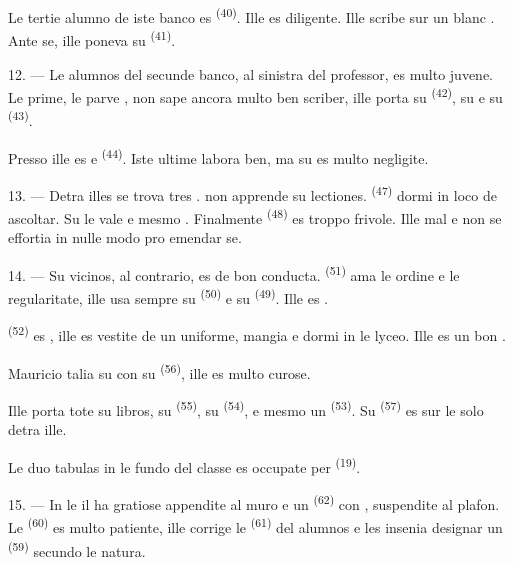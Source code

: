 Le tertie alumno de iste banco es  \textsuperscript{(40)}. Ille
es diligente. Ille scribe sur un blanc . Ante se, ille
poneva su  \textsuperscript{(41)}.

12. --- Le alumnos del secunde banco, al sinistra del professor, es multo juvene.
Le prime, le parve , non sape ancora multo ben scriber, ille
porta su  \textsuperscript{(42)}, su  e
su  \textsuperscript{(43)}.

Presso ille es  e  \textsuperscript{(44)}. Iste
ultime labora ben, ma su  es multo negligite.

13. --- Detra illes se trova tres .  non
apprende su lectiones.  \textsuperscript{(47)} dormi in loco de
ascoltar. Su  le vale  e mesmo
. Finalmente  \textsuperscript{(48)} es
troppo frivole. Ille  mal e non se effortia in nulle modo
pro emendar se.

14. --- Su vicinos, al contrario, es de bon conducta. 
\textsuperscript{(51)} ama le ordine e le regularitate, ille usa sempre su
 \textsuperscript{(50)} e su 
\textsuperscript{(49)}. Ille es .

 \textsuperscript{(52)} es , ille es vestite
de un uniforme, mangia e dormi in le lyceo. Ille es un bon .

Mauricio talia su  con su 
\textsuperscript{(56)}, ille es multo curose.

Ille porta tote su libros, su  \textsuperscript{(55)}, su
 \textsuperscript{(54)}, e mesmo un 
\textsuperscript{(53)}. Su  \textsuperscript{(57)} es
sur le solo detra ille.

Le duo tabulas in le fundo del classe es occupate per 
\textsuperscript{(19)}.

\VUsaut{4.6mm}
\VUsaut{3.4mm}

15. --- In le  il ha gratiose 
appendite al muro e un  \textsuperscript{(62)} con
, suspendite al plafon. Le 
\textsuperscript{(60)} es multo patiente, ille corrige le 
\textsuperscript{(61)} del alumnos e les insenia designar un 
\textsuperscript{(59)} secundo le natura.

